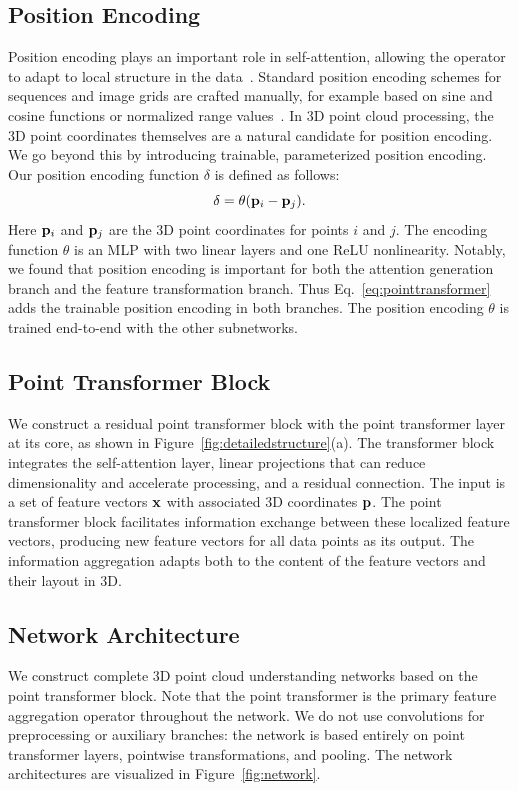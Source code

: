 \subsection{Position Encoding}
Position encoding plays an important role in self-attention, allowing the operator to adapt to local structure in the data~\cite{vaswani2017attention}. Standard position encoding schemes for sequences and image grids are crafted manually, for example based on sine and cosine functions or normalized range values~\cite{vaswani2017attention,zhao2020san}. In 3D point cloud processing, the 3D point coordinates themselves are a natural candidate for position encoding. We go beyond this by introducing trainable, parameterized position encoding. Our position encoding function $\delta$ is defined as follows:
\begin{equation}\label{eq:positionencoding}
\delta = \theta(\mathbf{p}_i - \mathbf{p}_j).
\end{equation}
Here $\mathbf{p}_i$ and $\mathbf{p}_j$ are the 3D point coordinates for points $i$ and $j$. The encoding function $\theta$ is an MLP with two linear layers and one ReLU nonlinearity. Notably, we found that position encoding is important for both the attention generation branch and the feature transformation branch. Thus Eq.~\ref{eq:pointtransformer} adds the trainable position encoding in both branches. The position encoding $\theta$ is trained end-to-end with the other subnetworks.

\subsection{Point Transformer Block}
We construct a residual point transformer block with the point transformer layer at its core, as shown in Figure~\ref{fig:detailedstructure}(a). The transformer block integrates the self-attention layer, linear projections that can reduce dimensionality and accelerate processing, and a residual connection. The input is a set of feature vectors $\mathbf{x}$ with associated 3D coordinates $\mathbf{p}$. The point transformer block facilitates information exchange between these localized feature vectors, producing new feature vectors for all data points as its output. The information aggregation adapts both to the content of the feature vectors and their layout in 3D.

\subsection{Network Architecture}
We construct complete 3D point cloud understanding networks based on the point transformer block. Note that the point transformer is the primary feature aggregation operator throughout the network. We do not use convolutions for preprocessing or auxiliary branches: the network is based entirely on point transformer layers, pointwise transformations, and pooling. The network architectures are visualized in Figure~\ref{fig:network}.

